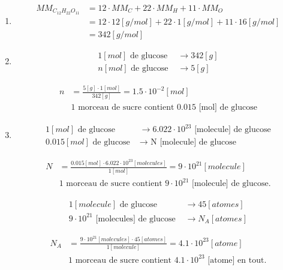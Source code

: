 \documentclass[
  11pt,
  french,
  a4paper,
  openany]{book}
\begin{document}
\begin{Answer}

\begin{enumerate}
\def\labelenumi{\arabic{enumi}.}
\item
  \[ \begin{split}
    MM_{C_{12}H_{22}O_{11}} &= 12 \cdot MM_C + 22 \cdot MM_H + 11 \cdot MM_O \\
    &= 12 \cdot 12 [g/mol] + 22 \cdot 1 [g/mol] + 11 \cdot 16 [g/mol] \\
    &= 342 [g/mol]
    \end{split} \]
\item
  \[  \begin{split}
   1 [mol] \text{ de glucose } & \longrightarrow 342 [g]\\
   n [mol] \text{ de glucose } & \longrightarrow 5 [g]
  \end{split} \]

  \[  \begin{split}
   n &= \frac{5[g] \cdot 1[mol]}{342[g]} = 1.5 \cdot 10^{-2} [mol] \\
   & \text{1 morceau de sucre contient 0.015 [mol] de glucose}
   \end{split} \]
\item
  \[  \begin{split}
   1 [mol] \text{ de glucose } & \longrightarrow 6.022 \cdot 10^{23} \text{ [molecule] de glucose} \\
   0.015 [mol] \text{ de glucose } & \longrightarrow \text{ N [molecule] de glucose}
   \end{split} \]

  \[  \begin{split}
  N &= \frac{0.015 [mol] \cdot 6.022\cdot 10^{23} [molecules]}{1 [mol]} = 9\cdot 10^{21} [molecule]\\
  & \text{1 morceau de sucre contient } 9\cdot 10^{21} \text{ [molecule] de glucose.}
  \end{split} \]

  \[  \begin{split}
   1 [molecule] \text{ de glucose } & \longrightarrow 45 [atomes] \\
   9\cdot 10^{21} \text{ [molecules] de glucose } & \longrightarrow N_A [atomes]
   \end{split} \]

  \[  \begin{split}
   N_A &= \frac{9 \cdot 10^{21} [molecules] \cdot 45 [atomes]}{1 [molecule]} = 4.1 \cdot 10^{23} [atome] \\
   & \text{1 morceau de sucre contient } 4.1 \cdot 10^{23} \text{ [atome] en tout.}
   \end{split} \]
\end{enumerate}


\end{Answer}
\end{document}
